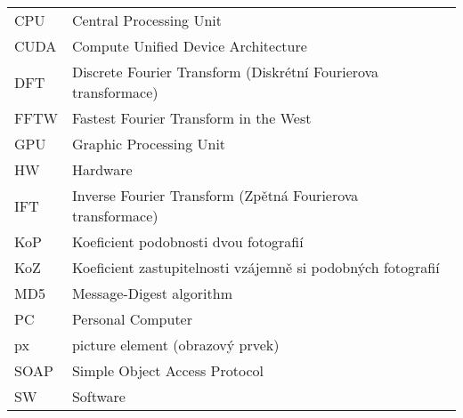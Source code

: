 
\seznamzkr

\begin{tabular}{ll}
  CPU	& Central Processing Unit											\\
  CUDA	& Compute Unified Device Architecture								\\
  DFT	& Discrete Fourier Transform (Diskrétní Fourierova transformace)	\\
  FFTW	& Fastest Fourier Transform in the West 							\\
  GPU	& Graphic Processing Unit											\\
  HW	& Hardware															\\
  IFT	& Inverse Fourier Transform (Zpětná Fourierova transformace)		\\
  KoP	& Koeficient podobnosti dvou fotografií								\\
  KoZ	& Koeficient zastupitelnosti vzájemně si podobných fotografií		\\
  MD5	& Message-Digest algorithm											\\
  PC	& Personal Computer													\\
  px	& picture element (obrazový prvek)									\\
  SOAP	& Simple Object Access Protocol										\\
  SW	& Software															\\
\end{tabular}

